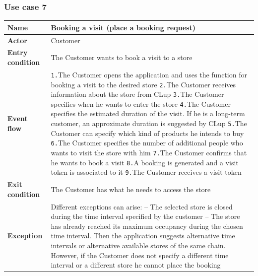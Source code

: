 \documentclass[a4paper,oneside,11pt]{book}   %
\begin{document}
    \subsubsection{Use case 7}
    \begin{longtable}[c] { |>{\bfseries{}}C{0.25\textwidth}|V{0.55\textwidth}| }
        \hline
        Name            & Booking a visit (place a booking request) \\ \hline
        Actor           & Customer \\ \hline
        Entry condition & The Customer wants to book a visit to a store \\ \hline
        Event flow      & 
        \texttt{1.}The Customer opens the application and uses the function for booking a visit to the desired store \newline
        \texttt{2.}The Customer receives information about the store from CLup \newline
        \texttt{3.}The Customer specifies when he wants to enter the store \newline
        \texttt{4.}The Customer specifies the estimated duration of the visit. If he is a long-term customer, an approximate duration is suggested by CLup \newline
        \texttt{5.}The Customer can specify which kind of products he intends to buy \newline
        \texttt{6.}The Customer specifies the number of additional people who wants to visit the store with him \newline
        \texttt{7.}The Customer confirms that he wants to book a visit \newline
        \texttt{8.}A booking is generated and a visit token is associated to it \newline
        \texttt{9.}The Customer receives a visit token \\ \hline
        Exit condition  & The Customer has what he needs to access the store \\ \hline
        Exception       & Different exceptions can arise: \newline
        -- The selected store is closed during the time interval specified by the customer \newline
        -- The store has already reached its maximum occupancy during the chosen time interval. Then the application suggests alternative time intervals or alternative available stores of the same chain. However, if the Customer does not specify a different time interval or a different store he cannot place the booking \newline

\end{longtable}
\end{document}
